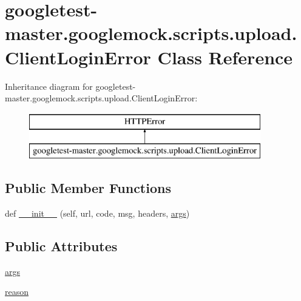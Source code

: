 \hypertarget{classgoogletest-master_1_1googlemock_1_1scripts_1_1upload_1_1_client_login_error}{}\section{googletest-\/master.googlemock.\+scripts.\+upload.\+Client\+Login\+Error Class Reference}
\label{classgoogletest-master_1_1googlemock_1_1scripts_1_1upload_1_1_client_login_error}
Inheritance diagram for googletest-\/master.googlemock.\+scripts.\+upload.\+Client\+Login\+Error\+:\begin{figure}[H]
\begin{center}
\leavevmode
\includegraphics[height=2.000000cm]{d2/db4/classgoogletest-master_1_1googlemock_1_1scripts_1_1upload_1_1_client_login_error}
\end{center}
\end{figure}
\subsection*{Public Member Functions}
\begin{DoxyCompactItemize}
\item 
def \mbox{\hyperlink{classgoogletest-master_1_1googlemock_1_1scripts_1_1upload_1_1_client_login_error_ad26b15d579b7369299652396ed5c8cb7}{\+\_\+\+\_\+init\+\_\+\+\_\+}} (self, url, code, msg, headers, \mbox{\hyperlink{classgoogletest-master_1_1googlemock_1_1scripts_1_1upload_1_1_client_login_error_a1fd17464fdcc06d790a8fffba1941ca6}{args}})
\end{DoxyCompactItemize}
\subsection*{Public Attributes}
\begin{DoxyCompactItemize}
\item 
\mbox{\hyperlink{classgoogletest-master_1_1googlemock_1_1scripts_1_1upload_1_1_client_login_error_a1fd17464fdcc06d790a8fffba1941ca6}{args}}
\item 
\mbox{\hyperlink{classgoogletest-master_1_1googlemock_1_1scripts_1_1upload_1_1_client_login_error_ae0b42149c79b05e06d0997634c067ccd}{reason}}
\end{DoxyCompactItemize}


